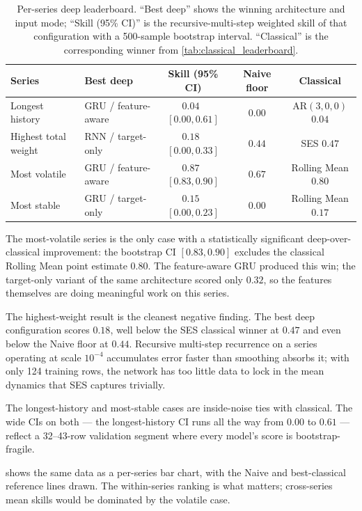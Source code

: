 \begin{table}[h]
\centering
\caption{Per-series deep leaderboard. ``Best deep'' shows the winning architecture and input mode; ``Skill (95\% CI)'' is the recursive-multi-step weighted skill of that configuration with a 500-sample bootstrap interval. ``Classical'' is the corresponding winner from \cref{tab:classical_leaderboard}.}
\label{tab:deep_leaderboard}
\begin{tabular}{l l c c c}
\toprule
Series & Best deep & Skill (95\% CI) & Naive floor & Classical \\
\midrule
Longest history     & GRU / feature-aware  & $0.04$ \,$[0.00, 0.61]$ & $0.00$ & AR$(3,0,0)$ $0.04$ \\
Highest total weight & RNN / target-only    & $0.18$ \,$[0.00, 0.33]$ & $0.44$ & SES $0.47$ \\
Most volatile       & GRU / feature-aware  & $\mathbf{0.87}$ \,$[\mathbf{0.83}, \mathbf{0.90}]$ & $0.67$ & Rolling Mean $0.80$ \\
Most stable         & GRU / target-only    & $0.15$ \,$[0.00, 0.23]$ & $0.00$ & Rolling Mean $0.17$ \\
\bottomrule
\end{tabular}
\end{table}

The most-volatile series is the only case with a statistically significant deep-over-classical improvement: the bootstrap CI $[0.83, 0.90]$ excludes the classical Rolling Mean point estimate $0.80$. The feature-aware GRU produced this win; the target-only variant of the same architecture scored only $0.32$, so the features themselves are doing meaningful work on this series.

The highest-weight result is the cleanest negative finding. The best deep configuration scores $0.18$, well below the SES classical winner at $0.47$ and even below the Naive floor at $0.44$. Recursive multi-step recurrence on a series operating at scale $10^{-4}$ accumulates error faster than smoothing absorbs it; with only 124 training rows, the network has too little data to lock in the mean dynamics that SES captures trivially.

The longest-history and most-stable cases are inside-noise ties with classical. The wide CIs on both --- the longest-history CI runs all the way from $0.00$ to $0.61$ --- reflect a 32--43-row validation segment where every model's score is bootstrap-fragile.

 shows the same data as a per-series bar chart, with the Naive and best-classical reference lines drawn. The within-series ranking is what matters; cross-series mean skills would be dominated by the volatile case.


